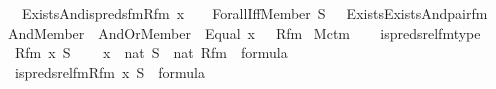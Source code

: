 \begin{isabellebody}
\ \ \ \ Exists{\isacharparenleft}{\kern0pt}And{\isacharparenleft}{\kern0pt}is{\isacharunderscore}{\kern0pt}preds{\isacharunderscore}{\kern0pt}fm{\isacharparenleft}{\kern0pt}Rfm{\isacharcomma}{\kern0pt}\ x\ {\isacharhash}{\kern0pt}{\isacharplus}{\kern0pt}\ {}{\isacharcomma}{\kern0pt}\ {}{\isacharparenright}{\kern0pt}{\isacharcomma}{\kern0pt}\ Forall{\isacharparenleft}{\kern0pt}Iff{\isacharparenleft}{\kern0pt}Member{\isacharparenleft}{\kern0pt}{}{\isacharcomma}{\kern0pt}\ S\ {\isacharhash}{\kern0pt}{\isacharplus}{\kern0pt}\ {}{\isacharparenright}{\kern0pt}{\isacharcomma}{\kern0pt}\ Exists{\isacharparenleft}{\kern0pt}Exists{\isacharparenleft}{\kern0pt}And{\isacharparenleft}{\kern0pt}pair{\isacharunderscore}{\kern0pt}fm{\isacharparenleft}{\kern0pt}{}{\isacharcomma}{\kern0pt}\ {}{\isacharcomma}{\kern0pt}\ {}{\isacharparenright}{\kern0pt}{\isacharcomma}{\kern0pt}\ And{\isacharparenleft}{\kern0pt}Member{\isacharparenleft}{\kern0pt}{}{\isacharcomma}{\kern0pt}\ {}{\isacharparenright}{\kern0pt}{\isacharcomma}{\kern0pt}\ And{\isacharparenleft}{\kern0pt}Or{\isacharparenleft}{\kern0pt}Member{\isacharparenleft}{\kern0pt}{}{\isacharcomma}{\kern0pt}\ {}{\isacharparenright}{\kern0pt}{\isacharcomma}{\kern0pt}\ Equal{\isacharparenleft}{\kern0pt}{}{\isacharcomma}{\kern0pt}\ x\ {\isacharhash}{\kern0pt}{\isacharplus}{\kern0pt}\ {}{\isacharparenright}{\kern0pt}{\isacharparenright}{\kern0pt}{\isacharcomma}{\kern0pt}\ Rfm{\isacharparenright}{\kern0pt}{\isacharparenright}{\kern0pt}{\isacharparenright}{\kern0pt}{\isacharparenright}{\kern0pt}{\isacharparenright}{\kern0pt}{\isacharparenright}{\kern0pt}{\isacharparenright}{\kern0pt}{\isacharparenright}{\kern0pt}{\isacharparenright}{\kern0pt}{\isachardoublequoteclose}\isanewline
\isanewline
{}\isamarkupfalse%
\ M{\isacharunderscore}{\kern0pt}ctm\ \isanewline
{}\ \isanewline
\isanewline
{}\isamarkupfalse%
\ is{\isacharunderscore}{\kern0pt}preds{\isacharunderscore}{\kern0pt}rel{\isacharunderscore}{\kern0pt}fm{\isacharunderscore}{\kern0pt}type\ {\isacharcolon}{\kern0pt}\ \isanewline
\ \ \ Rfm\ x\ S\ \isanewline
\ \ \ {\isachardoublequoteopen}x\ {\isasymin}\ nat{\isachardoublequoteclose}\ {\isachardoublequoteopen}S\ {\isasymin}\ nat{\isachardoublequoteclose}\ {\isachardoublequoteopen}Rfm\ {\isasymin}\ formula{\isachardoublequoteclose}\ \isanewline
\ \ \ {\isachardoublequoteopen}is{\isacharunderscore}{\kern0pt}preds{\isacharunderscore}{\kern0pt}rel{\isacharunderscore}{\kern0pt}fm{\isacharparenleft}{\kern0pt}Rfm{\isacharcomma}{\kern0pt}\ x{\isacharcomma}{\kern0pt}\ S{\isacharparenright}{\kern0pt}\ {\isasymin}\ formula{\isachardoublequoteclose}\isanewline

\end{isabellebody}
